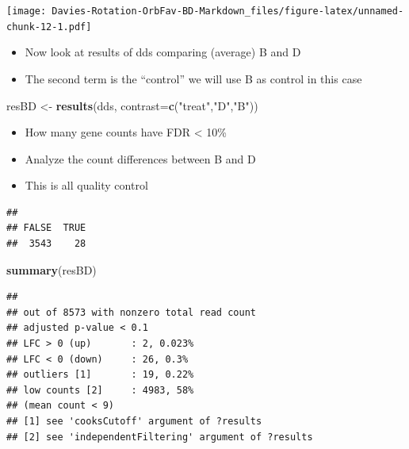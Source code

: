 \documentclass[
]{article}
\newenvironment{Shaded}{\begin{snugshade}}{\end{snugshade}}
\newcommand{\DataTypeTok}[1]{\textcolor[rgb]{0.13,0.29,0.53}{#1}}
\newcommand{\FloatTok}[1]{\textcolor[rgb]{0.00,0.00,0.81}{#1}}
\newcommand{\KeywordTok}[1]{\textcolor[rgb]{0.13,0.29,0.53}{\textbf{#1}}}
\newcommand{\NormalTok}[1]{#1}
\newcommand{\OperatorTok}[1]{\textcolor[rgb]{0.81,0.36,0.00}{\textbf{#1}}}
\newcommand{\StringTok}[1]{\textcolor[rgb]{0.31,0.60,0.02}{#1}}
\providecommand{\tightlist}{%
  \setlength{\itemsep}{0pt}\setlength{\parskip}{0pt}}
\begin{document}
\texttt{[image: Davies-Rotation-OrbFav-BD-Markdown\_files/figure-latex/unnamed-chunk-12-1.pdf]}

\begin{itemize}
\tightlist
\item
  Now look at results of dds comparing (average) B and D
\item
  The second term is the ``control'' we will use B as control in this
  case
\end{itemize}

\begin{Shaded}
\begin{Highlighting}[]
\NormalTok{resBD <-}\StringTok{ }\KeywordTok{results}\NormalTok{(dds, }\DataTypeTok{contrast=}\KeywordTok{c}\NormalTok{(}\StringTok{"treat"}\NormalTok{,}\StringTok{"D"}\NormalTok{,}\StringTok{"B"}\NormalTok{))}
\end{Highlighting}
\end{Shaded}

\begin{itemize}
\tightlist
\item
  How many gene counts have FDR \textless{} 10\%
\item
  Analyze the count differences between B and D
\item
  This is all quality control
\end{itemize}

\begin{Shaded}
\end{Shaded}

\begin{verbatim}
## 
## FALSE  TRUE 
##  3543    28
\end{verbatim}

\begin{Shaded}
\begin{Highlighting}[]
\KeywordTok{summary}\NormalTok{(resBD)}
\end{Highlighting}
\end{Shaded}

\begin{verbatim}
## 
## out of 8573 with nonzero total read count
## adjusted p-value < 0.1
## LFC > 0 (up)       : 2, 0.023%
## LFC < 0 (down)     : 26, 0.3%
## outliers [1]       : 19, 0.22%
## low counts [2]     : 4983, 58%
## (mean count < 9)
## [1] see 'cooksCutoff' argument of ?results
## [2] see 'independentFiltering' argument of ?results
\end{verbatim}
\end{document}

